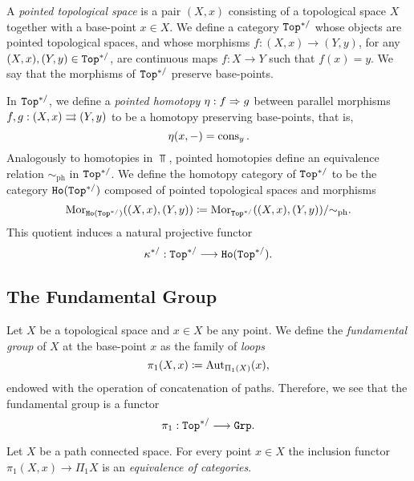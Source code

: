 \begin{definition}
    \label{def:base-point-preserving-Top-cat}
    A \emph{pointed topological space} is a pair \((X, x)\) consisting of a
    topological space \(X\) together with a base-point \(x \in X\). We define a
    category \({\texttt{Top}^{*/}}\) whose objects are pointed topological spaces, and whose
    morphisms \(f: (X, x) \to (Y, y)\), for any \((X, x), (Y, y) \in {\texttt{Top}^{*/}}\), are
    continuous maps \(f: X \to Y\) such that \(f(x) = y\). We say that the morphisms
    of \({\texttt{Top}^{*/}}\) preserve base-points.

    In \({\texttt{Top}^{*/}}\), we define a \emph{pointed homotopy} \(\eta: f \Rightarrow g\) between
    parallel morphisms \(f, g: (X, x) \rightrightarrows (Y, y)\) to be a homotopy preserving
    base-points, that is,
    \[
        \eta(x, -) = \operatorname{cons}_y.
    \]
    Analogously to homotopies in \(\Top\), pointed homotopies define an equivalence
    relation \(\sim_{\text{ph}}\) in \({\texttt{Top}^{*/}}\). We define the homotopy category of
    \({\texttt{Top}^{*/}}\) to be the category \({\texttt{Ho}({\texttt{Top}^{*/}})}\) composed of pointed topological
    spaces and morphisms
    \[
        \operatorname{Mor}_{{\texttt{Ho}({\texttt{Top}^{*/}})}}((X, x), (Y, y))
        \coloneq \operatorname{Mor}_{{\texttt{Top}^{*/}}}((X, x), (Y, y))/{\sim_{\text{ph}}}.
    \]
    This quotient induces a natural projective functor
    \[
        \kappa^{*/}: {\texttt{Top}^{*/}} \longrightarrow {\texttt{Ho}({\texttt{Top}^{*/}})}.
    \]
\end{definition}

\subsection{The Fundamental Group}

\begin{definition}
    \label{def:fundamental-group}
    Let \(X\) be a topological space and \(x \in X\) be any point. We define
    the \emph{fundamental group} of \(X\) at the base-point \(x\) as the family of
    \emph{loops}
    \[
        \pi_1(X, x) \coloneq \operatorname{Aut}_{\Pi_1(X)}(x),
    \]
    endowed with the operation of concatenation of paths. Therefore, we see that the
    fundamental group is a functor
    \[
        \pi_1: {\texttt{Top}^{*/}} \longrightarrow {\texttt{Grp}}.
    \]
\end{definition}

\begin{proposition}
    \label{prop:pi1-equivalent-to-Pi1-for-connected-space}
    Let \(X\) be a path connected space. For every point \(x \in X\) the inclusion
    functor \(\pi_1(X, x) \to \Pi_1 X\) is an \emph{equivalence of categories}.
\end{proposition}

